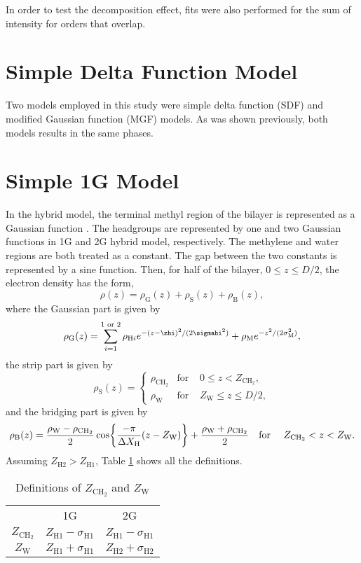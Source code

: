 \documentclass[12pt,letterpaper]{article}
\newcommand{\zh}[1]{Z_{\mathrm{H}#1}}
\newcommand{\zw}{Z_\mathrm{W}}
\newcommand{\zchtwo}{Z_\mathrm{CH_2}}
\newcommand{\sigmah}[1]{\sigma_{\mathrm{H}#1}}
\newcommand{\sigmam}{\sigma_\mathrm{M}}
\newcommand{\rhoh}[1]{\rho_{\mathrm{H}#1}}
\newcommand{\rhom}{\rho_\mathrm{M}}
\newcommand{\rhog}{\rho_\mathrm{G}}
\newcommand{\rhos}{\rho_\mathrm{S}}
\newcommand{\rhob}{\rho_\mathrm{B}}
\newcommand{\rhow}{\rho_\mathrm{W}}
\newcommand{\rhochtwo}{\rho_\mathrm{CH_2}}
\newcommand{\deltaxh}{\Delta X_\mathrm{H}}
\begin{document}
In order to test the decomposition effect, fits were also performed
for the sum of intensity for orders that overlap. 

\section{Simple Delta Function Model}
Two models employed in this study were simple delta function (SDF) and
modified Gaussian function (MGF) models. As was shown previously,
both models results in the same phases.

\section{Simple 1G Model}
In the hybrid model, the terminal methyl region of the bilayer is represented
as a Gaussian function \cite{ref:Wiener89}. The headgroups are represented by one 
and two Gaussian
functions in 1G and 2G hybrid model, respectively. The methylene and water 
regions are both treated as a constant. The gap between the two constants is 
represented by a sine function. Then, for half of the bilayer, 
$0 \leq z \leq D/2$, the electron density has the form, 
\begin{equation}
  \rho(z) = \rhog(z) + \rhos(z) + \rhob(z),
\end{equation}
where the Gaussian part is given by 
\begin{equation}
  \rhog(z) = \sum_{i=1}^{1\text{ or }2} \rhoh{i}
             e^{-(z-\zhi)^2/(2\sigmahi^2)} + \rhom e^{-z^2/(2\sigmam^2)},
\end{equation}
the strip part is given by
\begin{equation}
  \rhos(z) = \left\{
    \begin{array}{ccc}
      \rhochtwo & \text{for } & 0 \leq z < \zchtwo, \\
      \rhow   & \text{for } & \zw \leq z \leq D/2,
    \end{array}
  \right.
\end{equation}
and the bridging part is given by
\begin{equation}
  \rhob(z) = \frac{\rhow-\rhochtwo}{2} \cos \braces{
    \frac{-\pi}{\deltaxh}(z-\zw)} + \frac{\rhow+\rhochtwo}{2}
  \text{\quad for \quad} \zchtwo < z < \zw.
\end{equation}
Assuming $\zh{2} > \zh{1}$, Table \ref{tb:zchtwozw} shows all the definitions.

\begin{table}[ht]
  \centering
  \begin{tabular}{c c c}
     & 1G & 2G \\
    $\zchtwo$ & $\zh{1}-\sigmah{1}$ & $\zh{1}-\sigmah{1}$ \\
    $\zw$ & $\zh{1}+\sigmah{1}$ & $\zh{2}+\sigmah{2}$   
  \end{tabular}
  \caption{Definitions of $\zchtwo$ and $\zw$}
  \label{tb:zchtwozw}
\end{table}
\end{document}
